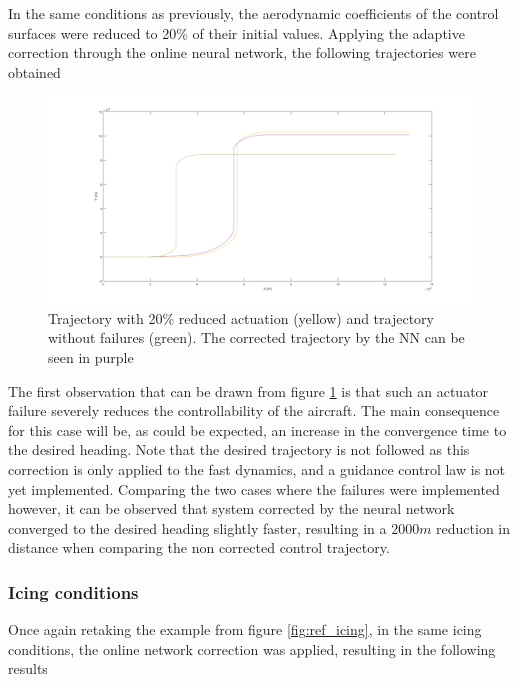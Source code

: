 In the same conditions as previously, the aerodynamic coefficients of the control surfaces were reduced to 20\% of their initial values. Applying the adaptive correction through the online neural network, the following trajectories were obtained

\begin{figure}[H]
\centering
\includegraphics[width=\textwidth]{Figures/Results/reduced_act_NN.png}
\caption[Trajectory with reduced actuation corrected with NN correction]{Trajectory with 20\% reduced actuation (yellow) and trajectory without failures (green). The corrected trajectory by the NN can be seen in purple}
\label{fig:reduced_act_NN}
\end{figure}

The first observation that can be drawn from figure \ref{fig:reduced_act_NN} is that such an actuator failure severely reduces the controllability of the aircraft. The main consequence for this case will be, as could be expected, an increase in the convergence time to the desired heading. Note that the desired trajectory is not followed as this correction is only applied to the fast dynamics, and a guidance control law is not yet implemented. Comparing the two cases where the failures were implemented however, it can be observed that system corrected by the neural network converged to the desired heading slightly faster, resulting in a $2000m$ reduction in distance when comparing the non corrected control trajectory.


\subsubsection{Icing conditions}

Once again retaking the example from figure \ref{fig:ref_icing}, in the same icing conditions, the online network correction was applied, resulting in the following results

